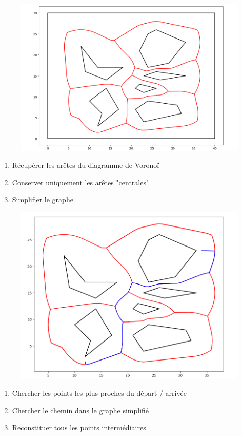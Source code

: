 \begin{frame}
    \begin{figure}
        \centering
        \includegraphics[width=0.7\linewidth]{assets/Voronoi_mapping.png}
    \end{figure}
    \begin{enumerate}
        \item Récupérer les arêtes du diagramme de Voronoï
        \item Conserver uniquement les arêtes "centrales"
        \item Simplifier le graphe
    \end{enumerate}
\end{frame}

\begin{frame}
    \begin{figure}
        \centering
        \includegraphics[width=0.65\linewidth]{assets/Voronoi_chemin_highlight.png}
    \end{figure}
    \begin{enumerate}
        \item Chercher les points les plus proches du départ / arrivée
        \item Chercher le chemin dans le graphe simplifié
        \item Reconstituer tous les points intermédiaires
    \end{enumerate}
\end{frame}

